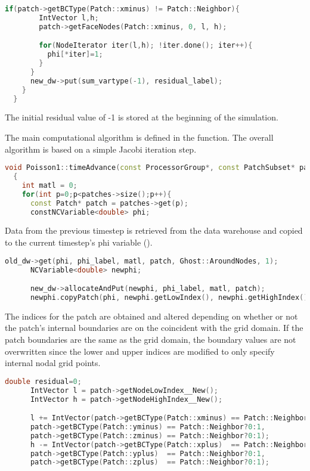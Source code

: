 \begin{lstlisting}[language=Cpp]
      if(patch->getBCType(Patch::xminus) != Patch::Neighbor){
        IntVector l,h;
        patch->getFaceNodes(Patch::xminus, 0, l, h);

        for(NodeIterator iter(l,h); !iter.done(); iter++){
          phi[*iter]=1;
        }
      }
      new_dw->put(sum_vartype(-1), residual_label);
    }
  }
\end{lstlisting}

The initial residual value of -1 is stored at the beginning of the
simulation.

The main computational algorithm is defined in the
 function.  The overall algorithm is based on a
simple Jacobi iteration step.

\begin{lstlisting}[language=Cpp]
  void Poisson1::timeAdvance(const ProcessorGroup*, const PatchSubset* patches, const MaterialSubset* matls, DataWarehouse* old_dw, DataWarehouse* new_dw)
  {
    int matl = 0;
    for(int p=0;p<patches->size();p++){
      const Patch* patch = patches->get(p);
      constNCVariable<double> phi;
\end{lstlisting}

    Data from the previous timestep is retrieved from the data warehouse
    and copied to the current timestep's phi variable ().

\begin{lstlisting}[language=Cpp]
      old_dw->get(phi, phi_label, matl, patch, Ghost::AroundNodes, 1);
      NCVariable<double> newphi;

      new_dw->allocateAndPut(newphi, phi_label, matl, patch);
      newphi.copyPatch(phi, newphi.getLowIndex(), newphi.getHighIndex());
\end{lstlisting}

    The indices for the patch are obtained and altered depending on
    whether or not the patch's internal boundaries are on the coincident
    with the grid domain.  If the patch boundaries are the same as the
    grid domain, the boundary values are not overwritten since the lower
    and upper indices are modified to only specify internal nodal grid
    points.



\begin{lstlisting}[language=Cpp]
      double residual=0;
      IntVector l = patch->getNodeLowIndex__New();
      IntVector h = patch->getNodeHighIndex__New();

      l += IntVector(patch->getBCType(Patch::xminus) == Patch::Neighbor?0:1,
      patch->getBCType(Patch::yminus) == Patch::Neighbor?0:1,
      patch->getBCType(Patch::zminus) == Patch::Neighbor?0:1);
      h -= IntVector(patch->getBCType(Patch::xplus)  == Patch::Neighbor?0:1,
      patch->getBCType(Patch::yplus)  == Patch::Neighbor?0:1,
      patch->getBCType(Patch::zplus)  == Patch::Neighbor?0:1);
\end{lstlisting}

